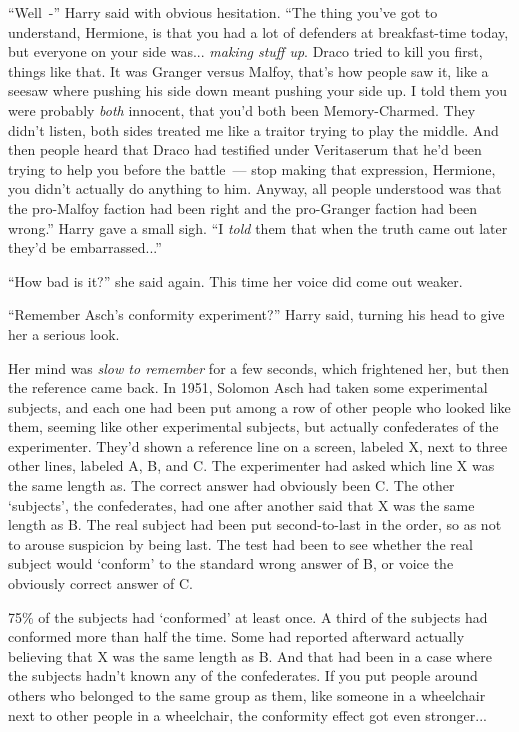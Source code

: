 ``Well~-'' Harry said with obvious hesitation. ``The thing you've got to understand, Hermione, is that you had a lot of defenders at breakfast-time today, but everyone on your side was... \emph{making stuff up}. Draco tried to kill you first, things like that. It was Granger versus Malfoy, that's how people saw it, like a seesaw where pushing his side down meant pushing your side up. I told them you were probably \emph{both} innocent, that you'd both been Memory-Charmed. They didn't listen, both sides treated me like a traitor trying to play the middle. And then people heard that Draco had testified under Veritaserum that he'd been trying to help you before the battle~--- stop making that expression, Hermione, you didn't actually do anything to him. Anyway, all people understood was that the pro-Malfoy faction had been right and the pro-Granger faction had been wrong.'' Harry gave a small sigh. ``I \emph{told} them that when the truth came out later they'd be embarrassed...''

``How bad is it?'' she said again. This time her voice did come out weaker.

``Remember Asch's conformity experiment?'' Harry said, turning his head to give her a serious look.

Her mind was \emph{slow to remember} for a few seconds, which frightened her, but then the reference came back. In 1951, Solomon Asch had taken some experimental subjects, and each one had been put among a row of other people who looked like them, seeming like other experimental subjects, but actually confederates of the experimenter. They'd shown a reference line on a screen, labeled X, next to three other lines, labeled A, B, and C. The experimenter had asked which line X was the same length as. The correct answer had obviously been C. The other `subjects', the confederates, had one after another said that X was the same length as B. The real subject had been put second-to-last in the order, so as not to arouse suspicion by being last. The test had been to see whether the real subject would `conform' to the standard wrong answer of B, or voice the obviously correct answer of C.

75\% of the subjects had `conformed' at least once. A third of the subjects had conformed more than half the time. Some had reported afterward actually believing that X was the same length as B. And that had been in a case where the subjects hadn't known any of the confederates. If you put people around others who belonged to the same group as them, like someone in a wheelchair next to other people in a wheelchair, the conformity effect got even stronger...

